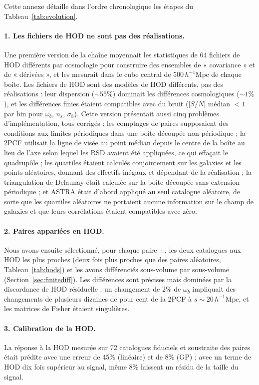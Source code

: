 \documentclass[11pt,twocolumn]{article}
\newcommand{\Mpch}{\,h^{-1}\mathrm{Mpc}}
\begin{document}
Cette annexe détaille dans l'ordre chronologique les étapes du Tableau~\ref{tab:evolution}.

\paragraph{1. Les fichiers de HOD ne sont pas des réalisations.} Une première version de la chaîne moyennait les statistiques de 64 fichiers de HOD différents par cosmologie pour construire des ensembles de « covariance » et de « dérivées », et les mesurait dans le cube central de $500\Mpch$ de chaque boîte. Les fichiers de HOD sont des modèles de HOD différents, pas des réalisations : leur dispersion ($\sim55\%$) dominait les différences cosmologiques ($\sim1\%$), et les différences finies étaient compatibles avec du bruit ($|S/N|$ médian $<1$ par bin pour $\omega_b$, $n_s$, $\sigma_8$). Cette version présentait aussi cinq problèmes d'implémentation, tous corrigés : les comptages de paires supposaient des conditions aux limites périodiques dans une boîte découpée non périodique ; la 2PCF utilisait la ligne de visée au point médian depuis le centre de la boîte au lieu de l'axe selon lequel les RSD avaient été appliquées, ce qui effaçait le quadrupôle ; les quartiles étaient calculés conjointement sur les galaxies et les points aléatoires, donnant des effectifs inégaux et dépendant de la réalisation ; la triangulation de Delaunay était calculée sur la boîte découpée sans extension périodique ; et ASTRA était d'abord appliqué au seul catalogue aléatoire, de sorte que les quartiles aléatoires ne portaient aucune information sur le champ de galaxies et que leurs corrélations étaient compatibles avec zéro.

\paragraph{2. Paires appariées en HOD.} Nous avons ensuite sélectionné, pour chaque paire $\pm$, les deux catalogues aux HOD les plus proches (deux fois plus proches que des paires aléatoires, Tableau~\ref{tab:hods}) et les avons différenciés sous-volume par sous-volume (Section~\ref{sec:finitediff}). Les différences sont précises mais dominées par la discordance de HOD résiduelle : un changement de 2\% de $\omega_b$ impliquait des changements de plusieurs dizaines de pour cent de la 2PCF à $s\sim20\Mpch$, et les matrices de Fisher étaient singulières.

\paragraph{3. Calibration de la HOD.} La réponse à la HOD mesurée sur 72 catalogues fiduciels et soustraite des paires était prédite avec une erreur de 45\% (linéaire) et de 8\% (GP) ; avec un terme de HOD dix fois supérieur au signal, même 8\% laissent un résidu de la taille du signal.
\end{document}
